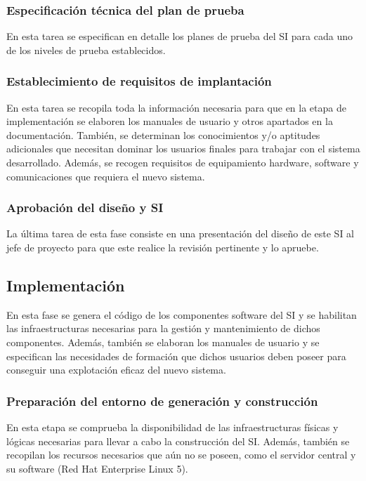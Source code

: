 \documentclass[11pt,a4paper,spanish,twoside]{book}
\begin{document}
\subsubsection{Especificación técnica del plan de prueba}
En esta tarea se especifican en detalle los planes de prueba del SI para cada 
uno de los niveles de prueba establecidos.

\subsubsection{Establecimiento de requisitos de implantación}
En esta tarea se recopila toda la información necesaria para que en la etapa de 
implementación se elaboren los manuales de usuario y otros apartados en la 
documentación. También, se determinan los conocimientos y/o aptitudes
adicionales que necesitan dominar los usuarios finales para trabajar con el
sistema desarrollado. Además, se recogen requisitos de equipamiento hardware,
software y comunicaciones que requiera el nuevo sistema.  

\subsubsection{Aprobación del diseño y SI}
La última tarea de esta fase consiste en una presentación del diseño de este SI
al jefe de proyecto para que este realice la revisión pertinente y lo apruebe.

\subsection{Implementación}
En esta fase se genera el código de los componentes software del SI y se 
habilitan las infraestructuras necesarias para la gestión y mantenimiento de 
dichos componentes. Además, también se elaboran los manuales de usuario y se 
especifican las necesidades de formación que dichos usuarios deben poseer 
para conseguir una explotación eficaz del nuevo sistema.

\subsubsection{Preparación del entorno de generación y construcción}
En esta etapa se comprueba la disponibilidad de las infraestructuras físicas 
y lógicas necesarias para llevar a cabo la construcción del SI. Además, también
se recopilan los recursos necesarios que aún no se poseen, como el servidor 
central y su software (Red Hat Enterprise Linux 5).
\end{document}
